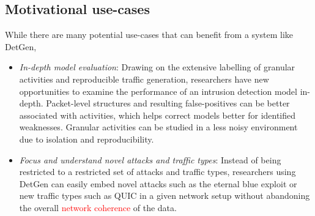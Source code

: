 \documentclass{article}
\begin{document}



\subsection*{Motivational use-cases}%

While there are many potential use-cases that can benefit from a system like DetGen, %

\begin{itemize}

\item \textit{In-depth model evaluation}:
Drawing on the extensive labelling of granular activities and reproducible traffic generation, researchers have new opportunities to examine the performance of an intrusion detection model in-depth. 
Packet-level structures and resulting false-positives can be better associated with activities, which helps correct models better for identified weaknesses. Granular activities can be studied in a less noisy environment due to isolation and reproducibility. 



\item \textit{Focus and understand novel attacks and traffic types}: Instead of being restricted to a restricted set of attacks and traffic types, researchers using DetGen can easily embed novel attacks such as the eternal blue exploit or new traffic types such as QUIC in a given network setup without abandoning the overall \textcolor{red}{network coherence} of the data. 






\end{itemize}
\end{document}
